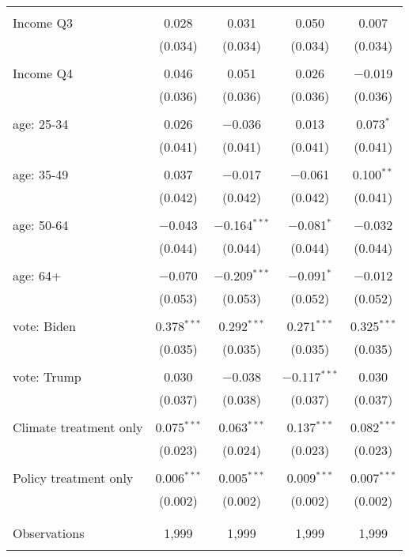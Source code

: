 \begin{tabular}{@{\extracolsep{5pt}}lcccc}
  & & & & \\ 
 Income Q3 & 0.028 & 0.031 & 0.050 & 0.007 \\ 
  & (0.034) & (0.034) & (0.034) & (0.034) \\ 
  & & & & \\ 
 Income Q4 & 0.046 & 0.051 & 0.026 & $-$0.019 \\ 
  & (0.036) & (0.036) & (0.036) & (0.036) \\ 
  & & & & \\ 
 age: 25-34 & 0.026 & $-$0.036 & 0.013 & 0.073$^{*}$ \\ 
  & (0.041) & (0.041) & (0.041) & (0.041) \\ 
  & & & & \\ 
 age: 35-49 & 0.037 & $-$0.017 & $-$0.061 & 0.100$^{**}$ \\ 
  & (0.042) & (0.042) & (0.042) & (0.041) \\ 
  & & & & \\ 
 age: 50-64 & $-$0.043 & $-$0.164$^{***}$ & $-$0.081$^{*}$ & $-$0.032 \\ 
  & (0.044) & (0.044) & (0.044) & (0.044) \\ 
  & & & & \\ 
 age: 64+ & $-$0.070 & $-$0.209$^{***}$ & $-$0.091$^{*}$ & $-$0.012 \\ 
  & (0.053) & (0.053) & (0.052) & (0.052) \\ 
  & & & & \\ 
 vote: Biden & 0.378$^{***}$ & 0.292$^{***}$ & 0.271$^{***}$ & 0.325$^{***}$ \\ 
  & (0.035) & (0.035) & (0.035) & (0.035) \\ 
  & & & & \\ 
 vote: Trump & 0.030 & $-$0.038 & $-$0.117$^{***}$ & 0.030 \\ 
  & (0.037) & (0.038) & (0.037) & (0.037) \\ 
  & & & & \\ 
 Climate treatment only & 0.075$^{***}$ & 0.063$^{***}$ & 0.137$^{***}$ & 0.082$^{***}$ \\ 
  & (0.023) & (0.024) & (0.023) & (0.023) \\ 
  & & & & \\ 
 Policy treatment only & 0.006$^{***}$ & 0.005$^{***}$ & 0.009$^{***}$ & 0.007$^{***}$ \\ 
  & (0.002) & (0.002) & (0.002) & (0.002) \\ 
  & & & & \\ 
\hline \\[-1.8ex] 

Observations & 1,999 & 1,999 & 1,999 & 1,999 \\ 
\hline 
\hline \\[-1.8ex] 
\end{tabular} 